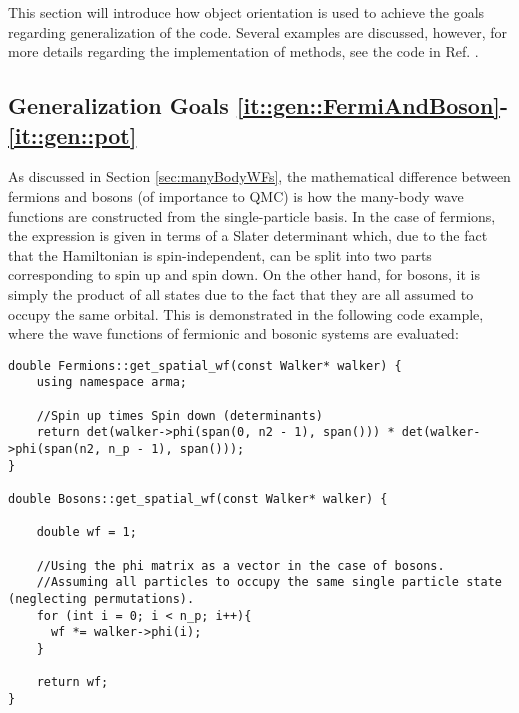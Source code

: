 This section will introduce how object orientation is used to achieve the goals regarding generalization of the code. Several examples are discussed, however, for more details regarding the implementation of methods, see the code in Ref. \cite{libBorealisCode}.

\subsection{Generalization Goals \ref{it::gen::FermiAndBoson}-\ref{it::gen::pot}}

As discussed in Section \ref{sec:manyBodyWFs}, the mathematical difference between fermions and bosons (of importance to QMC) is how the many-body wave functions are constructed from the single-particle basis. In the case of fermions, the expression is given in terms of a Slater determinant which, due to the fact that the Hamiltonian is spin-independent, can be split into two parts corresponding to spin up and spin down. On the other hand, for bosons, it is simply the product of all states due to the fact that they are all assumed to occupy the same orbital. This is demonstrated in the following code example, where the wave functions of fermionic and bosonic systems are evaluated:

\vspace{0.2cm}
\begin{lstlisting}[caption=The implementation of the evaluation of fermionic and bosonic wave functions. Line 5: The fermion class accesses the walker's single particle state matrix and returns the determinant of the first half (spin up) times the determinant of the second half (spin down). Line 14-16: The boson class simply calculates the product of all the single particle states.]
double Fermions::get_spatial_wf(const Walker* walker) {
    using namespace arma;
    
    //Spin up times Spin down (determinants)
    return det(walker->phi(span(0, n2 - 1), span())) * det(walker->phi(span(n2, n_p - 1), span()));
}

double Bosons::get_spatial_wf(const Walker* walker) {
 
    double wf = 1;
 
    //Using the phi matrix as a vector in the case of bosons.
    //Assuming all particles to occupy the same single particle state (neglecting permutations).
    for (int i = 0; i < n_p; i++){
      wf *= walker->phi(i);
    }
    
    return wf;
}
\end{lstlisting}

